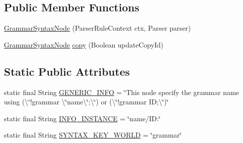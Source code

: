 \subsection*{Public Member Functions}
\begin{DoxyCompactItemize}
\item 
\hyperlink{classit_1_1emarolab_1_1cagg_1_1core_1_1language_1_1syntax_1_1abstractTree_1_1syntaxNodeType_1_1GrammarSyntaxNode_aeb45d574a7f99dcab9569ee566ef07ce}{Grammar\-Syntax\-Node} (Parser\-Rule\-Context ctx, Parser parser)
\item 
\hyperlink{classit_1_1emarolab_1_1cagg_1_1core_1_1language_1_1syntax_1_1abstractTree_1_1syntaxNodeType_1_1GrammarSyntaxNode}{Grammar\-Syntax\-Node} \hyperlink{classit_1_1emarolab_1_1cagg_1_1core_1_1language_1_1syntax_1_1abstractTree_1_1syntaxNodeType_1_1GrammarSyntaxNode_a48f416dbe54ce9a4dcf6a69965034550}{copy} (Boolean update\-Copy\-Id)
\end{DoxyCompactItemize}
\subsection*{Static Public Attributes}
\begin{DoxyCompactItemize}
\item 
static final String \hyperlink{classit_1_1emarolab_1_1cagg_1_1core_1_1language_1_1syntax_1_1abstractTree_1_1syntaxNodeType_1_1GrammarSyntaxNode_aea5af6b4909ae2c5c6b7f2d539a94221}{G\-E\-N\-E\-R\-I\-C\-\_\-\-I\-N\-F\-O} = \char`\"{}This node specify the grammar name using (\textbackslash{}\char`\"{}!grammar \textbackslash{}\char`\"{}name\textbackslash{}\char`\"{};\textbackslash{}\char`\"{}) or (\textbackslash{}\char`\"{}!grammar I\-D;\textbackslash{}\char`\"{})\char`\"{}
\item 
static final String \hyperlink{classit_1_1emarolab_1_1cagg_1_1core_1_1language_1_1syntax_1_1abstractTree_1_1syntaxNodeType_1_1GrammarSyntaxNode_a4452cf7d301f37a167308290508fa841}{I\-N\-F\-O\-\_\-\-I\-N\-S\-T\-A\-N\-C\-E} = \char`\"{}name/I\-D\-:\char`\"{}
\item 
static final String \hyperlink{classit_1_1emarolab_1_1cagg_1_1core_1_1language_1_1syntax_1_1abstractTree_1_1syntaxNodeType_1_1GrammarSyntaxNode_ac01c32f7b87b5afbdd356879c4c3b2a4}{S\-Y\-N\-T\-A\-X\-\_\-\-K\-E\-Y\-\_\-\-W\-O\-R\-L\-D} = \char`\"{}grammar\char`\"{}
\end{DoxyCompactItemize}
